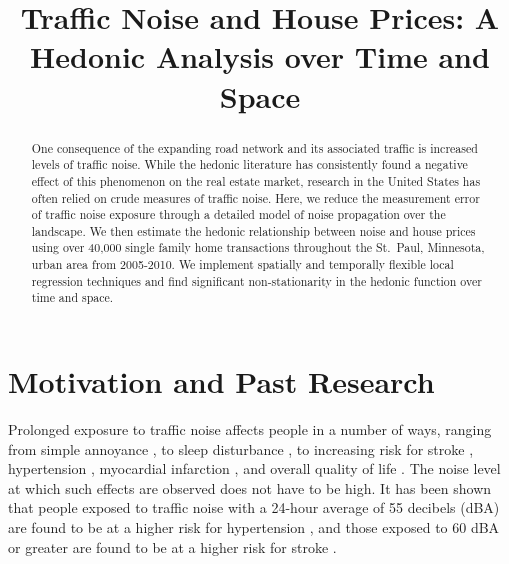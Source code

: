 \documentclass{article}\usepackage{graphicx, color}
\title{Traffic Noise and House Prices: A Hedonic Analysis over Time and Space}
\date{}
\author{}%
\begin{document}
\maketitle
{}
\begin{singlespace}
\begin{abstract}
One consequence of the expanding road network and its associated traffic is increased levels of traffic noise.  While the hedonic literature has consistently found a negative effect of this phenomenon on the real estate market, research in the United States has often relied on crude measures of traffic noise. Here, we reduce the measurement error of traffic noise exposure through a detailed model of noise propagation over the landscape. We then estimate the hedonic relationship between noise and house prices using over 40,000 single family home transactions throughout the St.\ Paul, Minnesota, urban area from 2005-2010. We implement spatially and temporally flexible local regression techniques and find significant non-stationarity in the hedonic function over time and space.
\end{abstract}
\end{singlespace}

\clearpage
{} 

\linenumbers

\section{Motivation and Past Research}\label{sec:lit}
Prolonged exposure to traffic noise affects people in a number of ways, ranging from simple annoyance \citep{Miedema2001, Ouis2001, Ohrstrom2007, DeKluizenaar2013, Weinhold2013}, to sleep disturbance , to increasing risk for stroke \citep{Sorensen2011}, hypertension \citep{Jarup2008, Bodin2009}, myocardial infarction \citep{Babisch2005}, and overall quality of life \citep{Shepherd2013}. The noise level at which such effects are observed does not have to be high.  It has been shown that people exposed to traffic noise with a 24-hour average of 55 decibels (dBA) are found to be at a higher risk for hypertension \citep{Barregard2009, Bodin2009}, and those exposed to 60 dBA or greater are found to be at a higher risk for stroke \citep{Sorensen2011}.  
\end{document}
